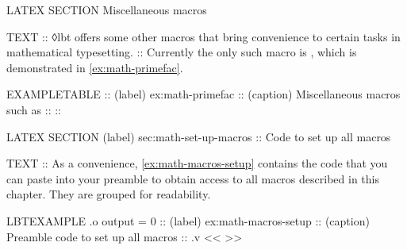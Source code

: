 \begin{lbt}
    LATEX \FloatBarrier
    SECTION Miscellaneous macros

    TEXT
    :: ◊lbt offers some other macros that bring convenience to certain tasks in mathematical typesetting.
    :: Currently the only such macro is , which is demonstrated in \vref{ex:math-primefac}.

    EXAMPLETABLE
    :: (label) ex:math-primefac
    :: (caption) Miscellaneous macros such as 
    :: 
    :: 


    LATEX \FloatBarrier
    SECTION (label) sec:math-set-up-macros :: Code to set up all macros

    TEXT
    :: As a convenience, \vref{ex:math-macros-setup} contains the code that you can paste into your preamble to obtain access to all macros described in this chapter. They are grouped for readability.

    LBTEXAMPLE .o output = 0
    :: (label) ex:math-macros-setup
    :: (caption) Preamble code to set up all  macros
    :: .v <<
    >>




\end{lbt}
